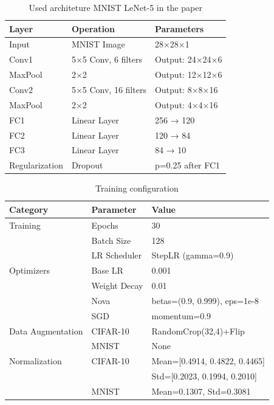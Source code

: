\documentclass{article}
\begin{document}
\begin{table}[H]
\centering
\caption{Used architeture  MNIST LeNet-5 in the paper}
\label{tab:resnet184}
\begin{tabular}{l|l|l}
\hline
\textbf{Layer} & \textbf{Operation} & \textbf{Parameters} \\
\hline
Input & MNIST Image & 28×28×1 \\
\hline
Conv1 & 5×5 Conv, 6 filters & Output: 24×24×6 \\
MaxPool & 2×2 & Output: 12×12×6 \\
\hline
Conv2 & 5×5 Conv, 16 filters & Output: 8×8×16 \\
MaxPool & 2×2 & Output: 4×4×16 \\
\hline
FC1 & Linear Layer & 256 → 120 \\
FC2 & Linear Layer & 120 → 84 \\
FC3 & Linear Layer & 84 → 10 \\
\hline
Regularization & Dropout & p=0.25 after FC1 \\
\hline
\end{tabular}
\end{table}



\begin{table}[H]
\centering
\caption{Training configuration}
\label{tab:resnet185}
\begin{tabular}{l|l|l}
\hline
\textbf{Category} & \textbf{Parameter} & \textbf{Value} \\
\hline
Training & Epochs & 30 \\
 & Batch Size & 128 \\
 & LR Scheduler & StepLR (gamma=0.9) \\
\hline
Optimizers & Base LR & 0.001 \\
 & Weight Decay & 0.01 \\
 & Nova & betas=(0.9, 0.999), eps=1e-8 \\
 & SGD & momentum=0.9 \\
\hline
Data Augmentation & CIFAR-10 & RandomCrop(32,4)+Flip \\
 & MNIST & None \\
\hline
Normalization & CIFAR-10 & Mean=[0.4914, 0.4822, 0.4465] \\
 & & Std=[0.2023, 0.1994, 0.2010] \\
 & MNIST & Mean=0.1307, Std=0.3081 \\
\hline
\end{tabular}
\end{table}
\end{document}
